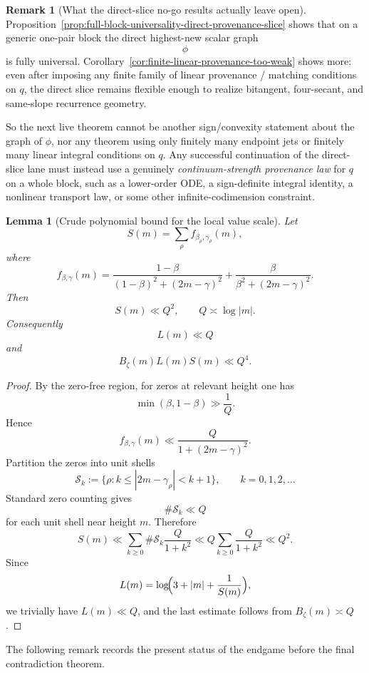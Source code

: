 \documentclass[11pt,a4paper]{amsart}
\theoremstyle{plain}
\newtheorem{lemma}[theorem]{Lemma}
\theoremstyle{definition}
\newtheorem{remark}[theorem]{Remark}
\begin{document}
\begin{remark}[What the direct-slice no-go results actually leave open]
\label{rem:what-direct-slice-no-go-results-leave-open}
Proposition~\ref{prop:full-block-universality-direct-provenance-slice} shows
that on a generic one-pair block the direct highest-new scalar graph
\[
\phi
\]
is fully universal. Corollary~\ref{cor:finite-linear-provenance-too-weak} shows
more: even after imposing any finite family of linear provenance / matching
conditions on $q$, the direct slice remains flexible enough to realize
bitangent, four-secant, and same-slope recurrence geometry.

So the next live theorem cannot be another sign/convexity statement about the
graph of $\phi$, nor any theorem using only finitely many endpoint jets or
finitely many linear integral conditions on $q$. Any successful continuation of
the direct-slice lane must instead use a genuinely
\emph{continuum-strength provenance law} for $q$ on a whole block, such as a
lower-order ODE, a sign-definite integral identity, a nonlinear transport law,
or some other infinite-codimension constraint.
\end{remark}

\begin{lemma}[Crude polynomial bound for the local value scale]
\label{lem:crude-S-bound}
Let
\[
S(m)=\sum_\rho f_{\beta_\rho,\gamma_\rho}(m),
\]
where
\[
f_{\beta,\gamma}(m)
=
\frac{1-\beta}{(1-\beta)^2+(2m-\gamma)^2}
+
\frac{\beta}{\beta^2+(2m-\gamma)^2}.
\]
Then
\[
S(m)\ll Q^2,
\qquad Q\asymp \log|m|.
\]
Consequently
\[
L(m)\ll Q
\]
and
\[
B_\zeta(m)L(m)S(m)\ll Q^4.
\]
\end{lemma}

\begin{proof}
By the zero-free region, for zeros at relevant height one has
\[
\min(\beta,1-\beta)\gg \frac1Q.
\]
Hence
\[
f_{\beta,\gamma}(m)\ll \frac{Q}{1+(2m-\gamma)^2}.
\]
Partition the zeros into unit shells
\[
\mathcal S_k:=\{\rho: k\le |2m-\gamma_\rho|<k+1\},
\qquad k=0,1,2,\dots
\]
Standard zero counting gives
\[
\#\mathcal S_k\ll Q
\]
for each unit shell near height $m$. Therefore
\[
S(m)
\ll
\sum_{k\ge 0}\#\mathcal S_k\frac{Q}{1+k^2}
\ll
Q\sum_{k\ge 0}\frac{Q}{1+k^2}
\ll
Q^2.
\]
Since
\[
L(m)=\log\!\Bigl(3+|m|+\frac1{S(m)}\Bigr),
\]
we trivially have $L(m)\ll Q$, and the last estimate follows from
$B_\zeta(m)\asymp Q$.
\end{proof}

The following remark records the present status of the endgame before the
final contradiction theorem.
\end{document}
